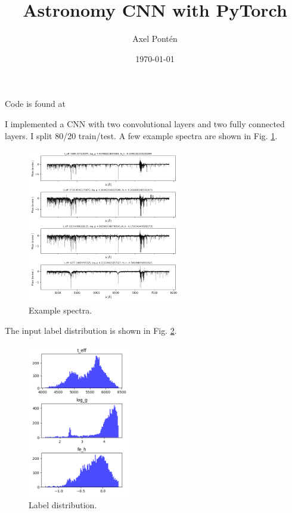 \documentclass[12pt, a4paper]{article}
\title{Astronomy CNN with PyTorch}
\author{Axel Pontén}
\date{\today}
\begin{document}
\maketitle

Code is found at 

I implemented a CNN with two convolutional layers and two fully connected layers. I split 80/20 train/test. A few example spectra are shown in Fig. \ref{fig:spectra}.

\begin{figure}[!h]
    \centering
    \includegraphics[width=0.6\textwidth]{../plots/spectra.png}
    \caption{Example spectra.}
    \label{fig:spectra}
\end{figure}


The input label distribution is shown in Fig. \ref{fig:label_dist}.
\begin{figure}[!h]
    \centering
    \includegraphics[width=0.4\textwidth]{../plots/normalize_target/labels.png}
    \caption{Label distribution.}
    \label{fig:label_dist}
\end{figure}
\end{document}
